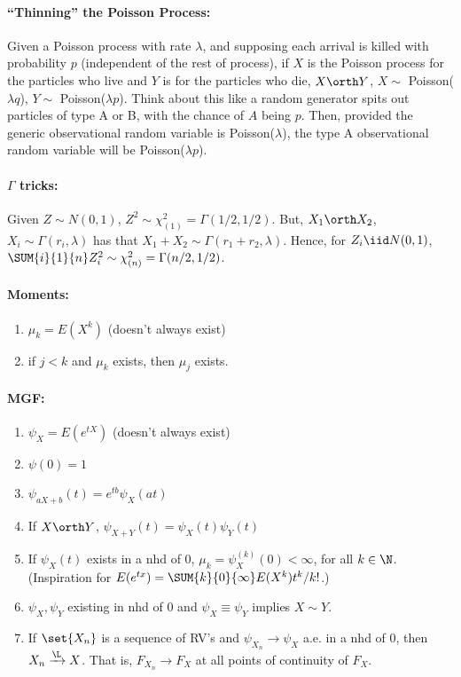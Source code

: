 \documentclass[10pt]{article}
\begin{document}
\begin{multicols}{2}
\paragraph{``Thinning'' the Poisson Process:} Given a Poisson process with rate $\lambda$, and supposing each arrival is killed with probability $p$ (independent of the rest of process), if $X$ is the Poisson process for the particles who live and $Y$ is for the particles who die, $X \orth Y$, $X \sim$ Poisson($\lambda q$), $Y \sim$ Poisson($\lambda p$). Think about this like a random generator spits out particles of type A or B, with the chance of $A$ being $p$. Then, provided the generic observational random variable is Poisson($\lambda$), the type A observational random variable will be Poisson($\lambda p$). 
 
\paragraph{$\Gamma$ tricks:} Given $Z \sim N(0,1)$, $Z^2 \sim \chi^{2}_{(1)} = \Gamma(1/2,1/2)$. But, $X_1 \orth X_2$, $X_i \sim \Gamma(r_i, \lambda)$ has that $X_1 + X_2 \sim \Gamma(r_1 + r_2, \lambda)$. Hence, for $Z_i \iid N(0,1)$, $\SUM{i}{1}{n} Z_i^2 \sim \chi_{(n)}^{2} = \Gamma(n/2, 1/2)$. 

\paragraph{Moments:}
\begin{enumerate}
\item $\mu_{k} = E(X^{k})$ (doesn't always exist)
\item if $j < k$ and $\mu_{k}$ exists, then $\mu_{j}$ exists. 
\end{enumerate}

\paragraph{MGF:}
\begin{enumerate}
\item $\psi_{X} = E(e^{tX})$ (doesn't always exist)
\item $\psi(0) = 1$
\item $\psi_{aX+b}(t) = e^{tb}\psi_{X}(at)$
\item If $X \orth Y$, $\psi_{X+Y}(t) = \psi_{X}(t) \psi_{Y}(t)$
\item If $\psi_{X}(t)$ exists in a nhd of 0, $\mu_{k} = \psi_{X}^{(k)}(0) < \infty$, for all $k \in \N$. (Inspiration for $E(e^{tx}) = \SUM{k}{0}{\infty} E(X^{k}) t^{k}/k!$.)
\item $\psi_{X}, \psi_{Y}$ existing in nhd of 0 and $\psi_{X} \equiv \psi_{Y}$ implies $X \sim Y$. 
\item If $\set{X_n}$ is a sequence of RV's and $\psi_{X_n} \to \psi_{X}$ a.e. in a nhd of 0, then $X_n \xrightarrow{\L} X$. That is, $F_{X_n} \to F_{X}$ at all points of continuity of $F_{X}$.
\end{enumerate}


\end{multicols}
\end{document}
